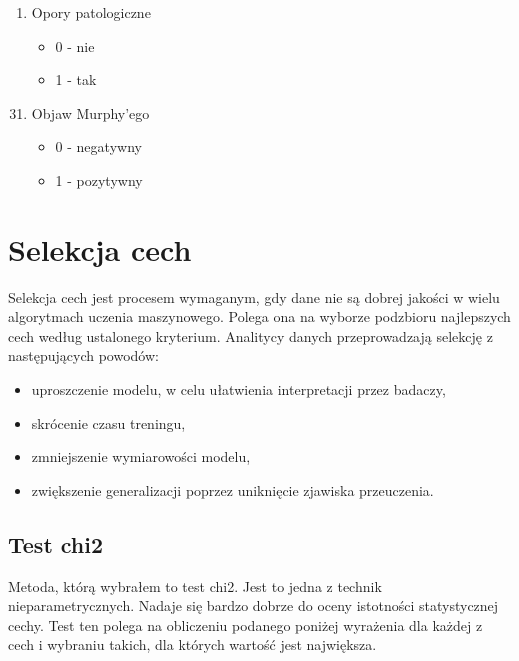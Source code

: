 \documentclass{report}
\begin{document}
\begin{itemize}
\begin{enumerate}
            \item Opory patologiczne
            \begin{itemize}
                \item 0 - nie
                \item 1 - tak
            \end{itemize}
        \end{enumerate}
        \begin{enumerate}
            \setcounter{enumi}{30}
            \item Objaw Murphy'ego
            \begin{itemize}
                \item 0 - negatywny
                \item 1 - pozytywny
            \end{itemize}
        \end{enumerate}
    \end{itemize}

    \section{Selekcja cech}

    Selekcja cech jest procesem wymaganym, gdy dane nie są dobrej jakości w wielu algorytmach uczenia maszynowego.
    Polega ona na wyborze podzbioru najlepszych cech według ustalonego kryterium.
    Analitycy danych przeprowadzają selekcję z następujących powodów:
    \begin{itemize}
        \item uproszczenie modelu, w celu ułatwienia interpretacji przez badaczy,
        \item skrócenie czasu treningu,
        \item zmniejszenie wymiarowości modelu,
        \item zwiększenie generalizacji poprzez uniknięcie zjawiska przeuczenia.
    \end{itemize}

    \subsection{Test chi2}

    Metoda, którą wybrałem to test chi2.
    Jest to jedna z technik nieparametrycznych.
    Nadaje się bardzo dobrze do oceny istotności statystycznej cechy.
    Test ten polega na obliczeniu podanego poniżej wyrażenia dla każdej z cech i wybraniu takich, dla których wartość jest największa.
\end{document}
